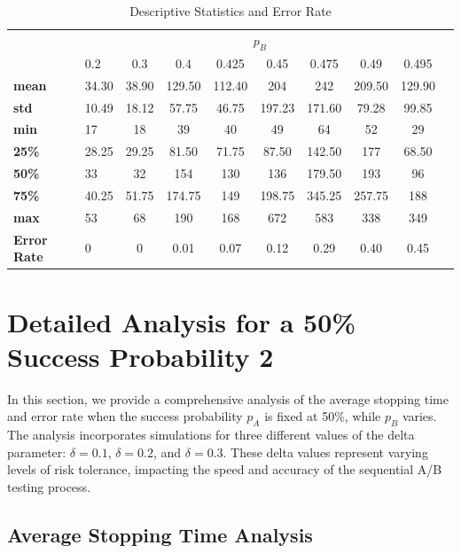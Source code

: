 \documentclass[magisterska, english]{pwr_wmat_praca_dyplomowa}
\theoremstyle{plain}
\numberwithin{theorem}{chapter}
\theoremstyle{definition}
\numberwithin{theorem}{chapter}
\begin{document}
\begin{table}
	\centering
	\caption{Descriptive Statistics and Error Rate}
	\label{tab:descriptive_stats}
	\begin{tabular}{llcccccccc}
		\toprule
		& \multicolumn{8}{c}{$p_B$} \\ \cmidrule(lr){2-9}
		& 0.2 & 0.3 & 0.4 & 0.425 & 0.45 & 0.475 & 0.49 & 0.495 \\
		\midrule
		\textbf{mean} & 34.30 & 38.90 & 129.50 & 112.40 & 204 & 242 & 209.50 & 129.90 \\
		\textbf{std} & 10.49 & 18.12 & 57.75 & 46.75 & 197.23 & 171.60 & 79.28 & 99.85 \\
		\textbf{min} & 17 & 18 & 39 & 40 & 49 & 64 & 52 & 29 \\
		\textbf{25\%} & 28.25 & 29.25 & 81.50 & 71.75 & 87.50 & 142.50 & 177 & 68.50 \\
		\textbf{50\%} & 33 & 32 & 154 & 130 & 136 & 179.50 & 193 & 96 \\
		\textbf{75\%} & 40.25 & 51.75 & 174.75 & 149 & 198.75 & 345.25 & 257.75 & 188 \\
		\textbf{max} & 53 & 68 & 190 & 168 & 672 & 583 & 338 & 349 \\
		\textbf{Error Rate} & 0 & 0 & 0.01 & 0.07 & 0.12 & 0.29 & 0.40 & 0.45 \\
		\bottomrule
	\end{tabular}
\end{table}





\section{Detailed Analysis for a 50\% Success Probability 2}

In this section, we provide a comprehensive analysis of the average stopping time and error rate when the success probability \( p_A \) is fixed at 50\%, while \( p_B \) varies. The analysis incorporates simulations for three different values of the delta parameter: \( \delta = 0.1 \), \( \delta = 0.2 \), and \( \delta = 0.3 \). These delta values represent varying levels of risk tolerance, impacting the speed and accuracy of the sequential A/B testing process.

\subsection{Average Stopping Time Analysis}
\end{document}
